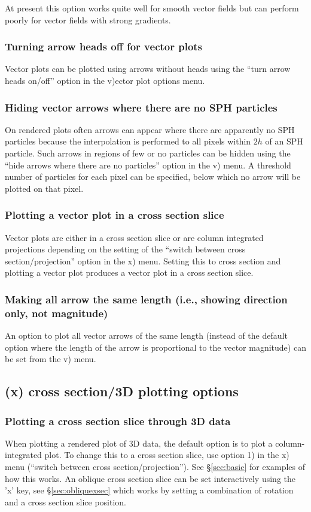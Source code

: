 \documentclass[a4paper,10pt]{article}
\begin{document}
  At present this option works quite well for smooth vector fields but can perform poorly for vector fields with strong gradients.

\subsubsection{ Turning arrow heads off for vector plots}
 Vector plots can be plotted using arrows without heads using the ``turn arrow heads on/off'' option in the v)ector plot options menu.

\subsubsection{ Hiding vector arrows where there are no SPH particles}
 On rendered plots often arrows can appear where there are apparently no SPH particles because the interpolation is performed to all pixels within $2h$ of an SPH particle. Such arrows in regions of few or no particles can be hidden using the ``hide arrows where there are no particles'' option in the v) menu. A threshold number of particles for each pixel can be specified, below which no arrow will be plotted on that pixel.

\subsubsection{ Plotting a vector plot in a cross section slice}
 Vector plots are either in a cross section slice or are column integrated projections depending on the setting of the ``switch between cross section/projection'' option in the x) menu. Setting this to cross section and plotting a vector plot produces a vector plot in a cross section slice.

\subsubsection{ Making all arrow the same length (i.e., showing direction only, not magnitude)}
 An option to plot all vector arrows of the same length (instead of the default option where the length of the arrow is proportional to the vector magnitude) can be set from the v) menu.

\subsection{(x) cross section/3D plotting options}%

\subsubsection{ Plotting a cross section slice through 3D data}
 When plotting a rendered plot of 3D data, the default option is to plot a column-integrated plot. To change this to a cross section slice, use option 1) in the x) menu (``switch between cross section/projection''). See \S\ref{sec:basic} for examples of how this works. An oblique cross section slice can be set interactively using the 'x' key, see \S\ref{sec:obliquexsec} which works by setting a combination of rotation and a cross section slice position. 
\end{document}
